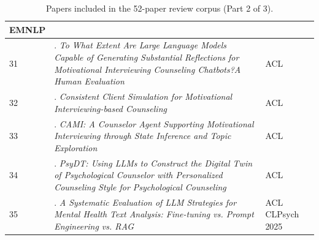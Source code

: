 \begin{table}[p]
\begin{tabular}{p{0.8cm}p{11.1cm}p{3.0cm}}
EMNLP \\
\midrule
31 &
\citealp{Basar2024To}. \textit{To What Extent Are Large Language Models Capable of Generating Substantial Reflections for Motivational Interviewing Counseling Chatbots?A Human Evaluation} &
ACL \\
\midrule
32 &
\citealp{Yang2025Consistent}. \textit{Consistent Client Simulation for Motivational Interviewing-based Counseling} &
ACL \\
\midrule
33 &
\citealp{Yang2025CAMI}. \textit{CAMI: A Counselor Agent Supporting Motivational Interviewing through State Inference and Topic Exploration} &
ACL \\
\midrule
34 &
\citealp{Xie2025PsyDT}. \textit{PsyDT: Using LLMs to Construct the Digital Twin of Psychological Counselor with Personalized Counseling Style for Psychological Counseling} &
ACL \\
\midrule
35 &
\citealp{Kermani2025Systematic}. \textit{A Systematic Evaluation of LLM Strategies for Mental Health Text Analysis: Fine-tuning vs. Prompt Engineering vs. RAG} &
ACL CLPsych 2025 \\
\bottomrule
\end{tabular}
\caption{Papers included in the 52-paper review corpus (Part 2 of 3).}
\label{tab:reviewed-corpus-2}
\end{table}

